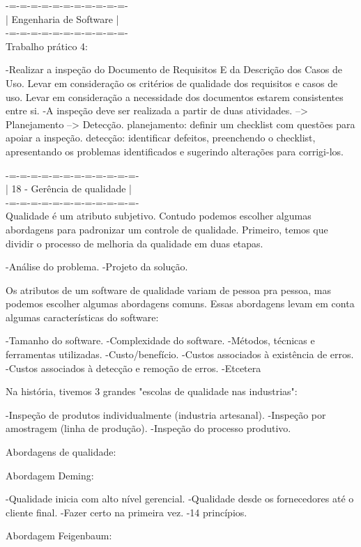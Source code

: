 \documentclass{article}
\begin{document}
-=-=-=-=-=-=-=-=-=-=-=-\\
| Engenharia de Software   |\\
-=-=-=-=-=-=-=-=-=-=-=-\\


Trabalho prático 4:

	-Realizar a inspeção do Documento de Requisitos E da Descrição dos Casos de Uso.
		Levar em consideração os critérios de qualidade dos requisitos e casos de uso.
		Levar em consideração a necessidade dos documentos estarem consistentes entre si.
	-A inspeção deve ser realizada a partir de duas atividades.
		--> Planejamento --> Detecção.
		planejamento: definir um checklist com questões para apoiar a inspeção.
		detecção: identificar defeitos, preenchendo o checklist, apresentando os problemas identificados e sugerindo alterações para corrigi-los.

-=-=-=-=-=-=-=-=-=-=-=-=-\\
| 18 - Gerência de qualidade   |\\
-=-=-=-=-=-=-=-=-=-=-=-=-\\

Qualidade é um atributo subjetivo. Contudo podemos escolher algumas abordagens para padronizar um controle de qualidade.
Primeiro, temos que dividir o processo de melhoria da qualidade em duas etapas.

	-Análise do problema.
	-Projeto da solução.

Os atributos de um software de qualidade variam de pessoa pra pessoa, mas podemos escolher algumas abordagens comuns.
Essas abordagens levam em conta algumas características do software:

	-Tamanho do software.
	-Complexidade do software.
	-Métodos, técnicas e ferramentas utilizadas.
	-Custo/benefício.
	-Custos associados à existência de erros.
	-Custos associados à detecção e remoção de erros.
	-Etcetera

Na história, tivemos 3 grandes "escolas de qualidade nas industrias":

	-Inspeção de produtos individualmente (industria artesanal).
	-Inspeção por amostragem (linha de produção).
	-Inspeção do processo produtivo.

Abordagens de qualidade:

	Abordagem Deming:

		-Qualidade inicia com alto nível gerencial.
		-Qualidade desde os fornecedores até o cliente final.
		-Fazer certo na primeira vez.
		-14 princípios.

	Abordagem Feigenbaum:
\end{document}
